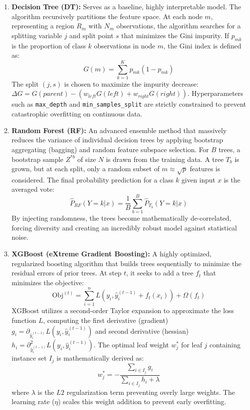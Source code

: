 \begin{enumerate}
    \item \textbf{Decision Tree (DT):} Serves as a baseline, highly interpretable model. The algorithm recursively partitions the feature space. At each node $m$, representing a region $R_m$ with $N_m$ observations, the algorithm searches for a splitting variable $j$ and split point $s$ that minimizes the Gini impurity. If $p_{mk}$ is the proportion of class $k$ observations in node $m$, the Gini index is defined as:
    \[
    G(m) = \sum_{k=1}^{K} p_{mk}(1 - p_{mk})
    \]
    The split $(j,s)$ is chosen to maximize the impurity decrease: $\Delta G = G(parent) - (w_{left}G(left) + w_{right}G(right))$. Hyperparameters such as \texttt{max\_depth} and \texttt{min\_samples\_split} are strictly constrained to prevent catastrophic overfitting on continuous data.

    \item \textbf{Random Forest (RF):} An advanced ensemble method that massively reduces the variance of individual decision trees by applying bootstrap aggregating (bagging) and random feature subspace selection. For $B$ trees, a bootstrap sample $Z^{*b}$ of size $N$ is drawn from the training data. A tree $T_b$ is grown, but at each split, only a random subset of $m \approx \sqrt{p}$ features is considered. The final probability prediction for a class $k$ given input $x$ is the averaged vote:
    \[
    \hat{P}_{RF}(Y=k | x) = \frac{1}{B} \sum_{b=1}^{B} \hat{P}_{T_b}(Y=k | x)
    \]
    By injecting randomness, the trees become mathematically de-correlated, forcing diversity and creating an incredibly robust model against statistical noise.

    \item \textbf{XGBoost (eXtreme Gradient Boosting):} A highly optimized, regularized boosting algorithm that builds trees sequentially to minimize the residual errors of prior trees. At step $t$, it seeks to add a tree $f_t$ that minimizes the objective:
    \[
    \text{Obj}^{(t)} = \sum_{i=1}^{n} L\left(y_i, \hat{y}_i^{(t-1)} + f_t(x_i)\right) + \Omega(f_t)
    \]
    XGBoost \parencite{chen2016xgboost} utilizes a second-order Taylor expansion to approximate the loss function $L$, computing the first derivative (gradient) $g_i = \partial_{\hat{y}_i^{(t-1)}} L(y_i, \hat{y}_i^{(t-1)})$ and second derivative (hessian) $h_i = \partial_{\hat{y}_i^{(t-1)}}^2 L(y_i, \hat{y}_i^{(t-1)})$. The optimal leaf weight $w_j^*$ for leaf $j$ containing instance set $I_j$ is mathematically derived as:
    \[
    w_j^* = -\frac{\sum_{i \in I_j} g_i}{\sum_{i \in I_j} h_i + \lambda}
    \]
    where $\lambda$ is the $L2$ regularization term preventing overly large weights. The learning rate ($\eta$) scales this weight addition to prevent early overfitting.


\end{enumerate}
